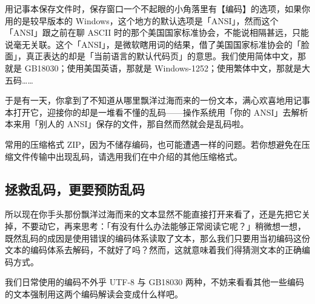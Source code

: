 用记事本保存文件时，保存窗口一个不起眼的小角落里有【编码】的选项，如果你用的是较早版本的 Windows，这个地方的默认选项是「ANSI」，然而这个「ANSI」跟之前在聊 ASCII 时的那个美国国家标准协会，不能说相隔甚远，只能说毫无关联。这个「ANSI」，是微软瞎用词的结果，借了美国国家标准协会的「脸面」，真正表达的却是「当前语言的默认代码页」的意思。我们使用简体中文，那就是 GB18030；使用美国英语，那就是 Windows-1252；使用繁体中文，那就是大五码……

于是有一天，你拿到了不知道从哪里飘洋过海而来的一份文本，满心欢喜地用记事本打开它，迎接你的却是一堆看不懂的乱码——操作系统用「你的 ANSI」去解析本来用「别人的 ANSI」保存的文件，那自然而然就会是乱码啦。

\begin{note}
  常用的压缩格式 ZIP，因为不储存编码，也可能遭遇一样的问题。若你想避免在压缩文件传输中出现乱码，请选用我们在中介绍的其他压缩格式。
\end{note}

\subsection{拯救乱码，更要预防乱码}

所以现在你手头那份飘洋过海而来的文本显然不能直接打开来看了，还是先把它关掉，不要动它，再来思考：「有没有什么办法能够正常阅读它呢？」稍微想一想，既然乱码的成因是使用错误的编码体系读取了文本，那么我们只要用当初编码这份文本的编码体系去解码，不就好了吗？然而，这就意味着我们得猜测文本的正确编码方式。

我们日常使用的编码不外乎 UTF-8 与 GB18030 两种，不妨来看看其他一些编码的文本强制用这两个编码解读会变成什么样吧。


